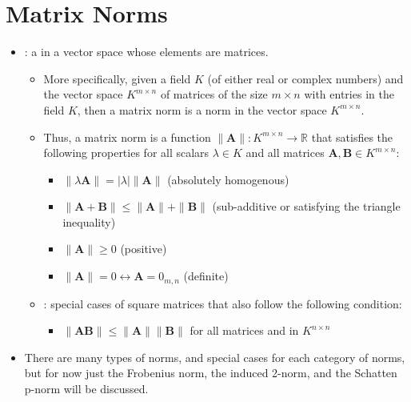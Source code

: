\section{Matrix Norms}\label{Matrix Norms}
\begin{itemize}
  \item {}: a \hyperref[Vector Length]{} in a vector space whose elements are matrices.
    \begin{itemize}
      \item More specifically, given a field \(K\) (of either real or complex numbers) and the vector space \(K^{m\times n}\) of matrices of the size \(m\times n\) with entries in the field \(K\), then a matrix norm is a norm in the vector space \(K^{m\times n}\). 
      \item Thus, a matrix norm is a function \( \| \bm{A} \| : K^{m \times n} \to \mathbb{R}\) that satisfies the following properties for all scalars \(\lambda \in K\) and all matrices \(\bm{A},\bm{B} \in K^{m\times n}\): 
      \begin{itemize}
        \item \( \| \lambda\bm{A} \|= |\lambda|\| \bm{A} \| \) (absolutely homogenous)
        \item \( \| \bm{A}+\bm{B} \| \leq \| \bm{A} \| + \| \bm{B} \| \) (sub-additive or satisfying the triangle inequality)
        \item \( \| \bm{A} \| \geq 0\) (positive)
        \item \( \| \bm{A} \| = 0 \leftrightarrow \bm{A}= 0_{m,n} \) (definite)
      \end{itemize}
      \item {}: special cases of square matrices that also follow the following condition:
        \begin{itemize}
          \item \( \| \bm{AB} \| \leq \| \bm{A} \| \| \bm{B} \| \) for all matrices  and  in \(K^{n\times n}\)
        \end{itemize}
    \end{itemize}
  \item There are many types of norms, and special cases for each category of norms, but for now just the Frobenius norm, the induced 2-norm, and the Schatten p-norm will be discussed.
  

\end{itemize}
